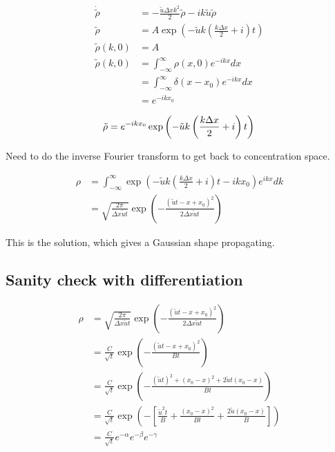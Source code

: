 \documentclass[a4paper]{article}
\begin{document}
\begin{align*}
\dot{\tilde{\rho}} & = - \frac{\tilde{u} \Delta x k^2}{2} \tilde{\rho} - ik \tilde{u} \tilde{\rho} \\
\tilde{\rho} & = A \exp \left( - \tilde{u} k \left( \frac{k \Delta x}{2} + i \right) t \right) \\
\tilde{\rho} (k, 0) & = A \\
\tilde{\rho} (k, 0) & = \int _{- \infty} ^{\infty} \rho (x, 0) e^{-ikx} dx \\
& = \int _{- \infty} ^{\infty} \delta (x - x_0)  e^{-ikx} dx \\
& = e^{-ik x_0} 
\end{align*}

\begin{equation}
\tilde{\rho}  = e^{-ik x_0} \exp \left( - \tilde{u} k \left( \frac{k \Delta x}{2} + i \right) t \right) \\
\end{equation}

Need to do the inverse Fourier transform to get back to concentration space.
 

\begin{align*}
\rho & = \int _{- \infty } ^{\infty} \exp \left( - \tilde{u} k \left( \frac{k \Delta x}{2} + i \right) t -ikx_0 \right) e^{ikx} dk \\
& = \sqrt{\frac{2 \pi}{\Delta x \tilde{u} t}} \exp \left( - \frac{(\tilde{u} t - x + x_0 )^2}{2 \Delta x \tilde{u} t} \right)
\end{align*}

This is the solution, which gives a Gaussian shape propagating. 

\subsection{Sanity check with differentiation}

\begin{align*}
\rho & = \sqrt{\frac{2 \pi}{\Delta x \tilde{u} t}} \exp \left( - \frac{(\tilde{u} t - x + x_0 )^2}{2 \Delta x \tilde{u} t} \right) \\
& = \frac{C}{\sqrt{t}} \exp \left( - \frac{(\tilde{u} t - x + x_0 )^2}{Bt} \right) \\
& = \frac{C}{\sqrt{t}} \exp \left( - \frac{(\tilde{u} t)^2 + (x_0 - x)^2 + 2 \tilde{u}t (x_0 - x)}{Bt} \right) \\
& = \frac{C}{\sqrt{t}} \exp \left( - \left[ \frac{\tilde{u} ^2 t}{B} + \frac{(x_0 - x)^2}{Bt} + \frac{2 \tilde{u} (x_0 - x)}{B} \right] \right) \\
& = \frac{C}{\sqrt{t}} e^{- \alpha} e^{- \beta} e^{- \gamma} \\
\end{align*}
\end{document}
